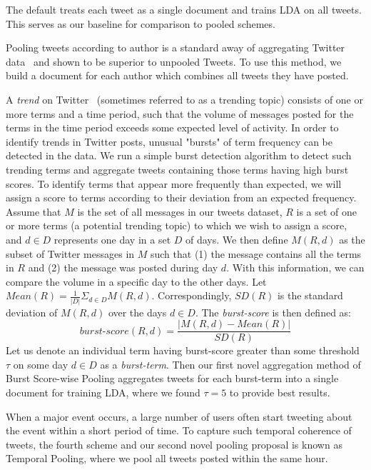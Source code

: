 \documentclass{sig-alternate}
\begin{document}
\vspace{1mm} The default treats
each tweet as a single document and trains LDA on all tweets. This
serves as our baseline for comparison to pooled schemes.

\vspace{1mm} Pooling tweets according to
author is a standard away of aggregating Twitter
data~\cite{Weng2010wsdm,hong} and shown to be superior to unpooled
Tweets.  To use this method, we build a document for each author which
combines all tweets they have posted.

\vspace{1mm} A \textit{trend} on
Twitter~\cite{mor} (sometimes referred to as a trending topic)
consists of one or more terms and a time period, such that the volume
of messages posted for the terms in the time period exceeds some
expected level of activity.  In order to identify trends in Twitter
posts, unusual "bursts" of term frequency can be detected in the data.
We run a simple burst detection algorithm to detect such trending
terms and aggregate tweets containing those terms having high burst
scores.  To identify terms that appear more frequently than expected,
we will assign a score to terms according to their deviation from an
expected frequency. Assume that $M$ is the set of all messages in our
tweets dataset, $R$ is a set of one or more terms (a potential
trending topic) to which we wish to assign a score, and $d \in D$
represents one day in a set $D$ of days.  We then define $M(R, d)$ as
the subset of Twitter messages in $M$ such that (1) the message
contains all the terms in $R$ and (2) the message was posted during
day $d$.  With this information, we can compare the volume in a
specific day to the other days.  Let $\mathit{Mean}(R) = \frac{1}{|D|}
\Sigma_{d \in D} M(R,d)$.  Correspondingly, $\mathit{SD}(R)$ is the
standard deviation of $M(R,d)$ over the days $d \in D$.  The
\textit{burst-score} is then defined as:
\[
\mathit{burst\textrm{-}score}(R,d) = \frac{|M(R,d) - \mathit{Mean}(R)|}{\mathit{SD}(R)} 
\]
Let us denote an individual term having burst-score greater than some
threshold $\tau$ on some day $d \in D$ as a \textit{burst-term}.  Then
our first novel aggregation method of Burst Score-wise Pooling
aggregates tweets for each burst-term into a single document for
training LDA, where we found $\tau = 5$ to provide best results.

\vspace{1mm} When a major event occurs, a
large number of users often start tweeting about the event within a
short period of time.  To capture such temporal coherence of tweets,
the fourth scheme and our second novel pooling proposal is known as
Temporal Pooling, where we pool all tweets posted within the same
hour.
\end{document}

